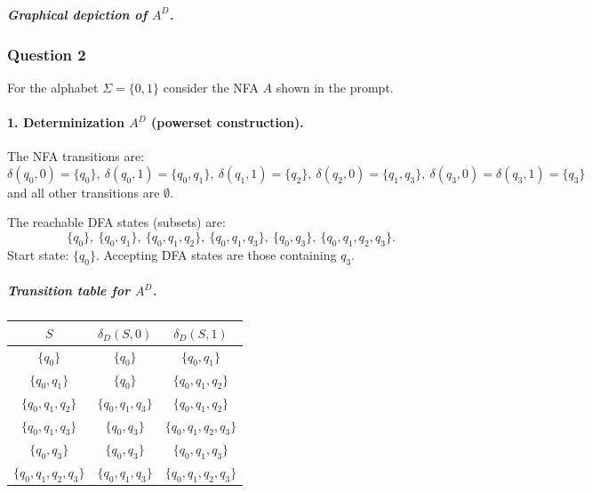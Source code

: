 \documentclass[11pt, a4paper]{article}
\theoremstyle{definition}
\theoremstyle{remark}
\begin{document}
\subparagraph{Graphical depiction of $A^D$.}
\begin{center}
\end{center}

\subsubsection*{Question 2}
For the alphabet $\Sigma=\{0,1\}$ consider the NFA $A$ shown in the prompt.

\paragraph{1. Determinization $A^D$ (powerset construction).}
The NFA transitions are:
\[
\delta(q_0,0)=\{q_0\},\ \delta(q_0,1)=\{q_0,q_1\},\ \delta(q_1,1)=\{q_2\},\ \delta(q_2,0)=\{q_1,q_3\},\ \delta(q_3,0)=\delta(q_3,1)=\{q_3\}
\]
and all other transitions are $\emptyset$.

The reachable DFA states (subsets) are:
\[
\{q_0\},\ \{q_0,q_1\},\ \{q_0,q_1,q_2\},\ \{q_0,q_1,q_3\},\ \{q_0,q_3\},\ \{q_0,q_1,q_2,q_3\}.
\]
Start state: $\{q_0\}$. Accepting DFA states are those containing $q_3$.

\subparagraph{Transition table for $A^D$.}
\begin{center}
\begin{tabular}{c|c|c}
$S$ & $\delta_D(S,0)$ & $\delta_D(S,1)$ \\ \hline
$\{q_0\}$ & $\{q_0\}$ & $\{q_0,q_1\}$ \\
$\{q_0,q_1\}$ & $\{q_0\}$ & $\{q_0,q_1,q_2\}$ \\
$\{q_0,q_1,q_2\}$ & $\{q_0,q_1,q_3\}$ & $\{q_0,q_1,q_2\}$ \\
$\{q_0,q_1,q_3\}$ & $\{q_0,q_3\}$ & $\{q_0,q_1,q_2,q_3\}$ \\
$\{q_0,q_3\}$ & $\{q_0,q_3\}$ & $\{q_0,q_1,q_3\}$ \\
$\{q_0,q_1,q_2,q_3\}$ & $\{q_0,q_1,q_3\}$ & $\{q_0,q_1,q_2,q_3\}$ \\
\end{tabular}
\end{center}
\end{document}
